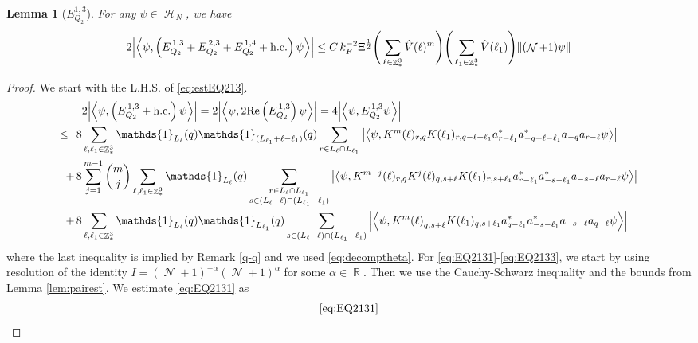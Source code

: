 \documentclass[sn-mathphys, Numbered ,a4paper]{sn-jnl}%
\DeclareMathOperator{\R}{\mathbb{R}}
\DeclareMathOperator{\Z}{\mathbb{Z}}
\DeclareMathOperator{\HH}{\mathcal{H}}
\DeclareMathOperator{\NN}{\mathcal{N}}
\newcommand{\half}{\frac{1}{2}}
\newcommand{\eva}[1]{\left\langle #1 \right\rangle}
\theoremstyle{plain}
\newtheorem{lemma}[theorem]{Lemma}
\theoremstyle{definition}
\theoremstyle{remark}
\theoremstyle{plain}
\theoremstyle{definition}
\theoremstyle{remark}
\begin{document}
\begin{lemma}[$E_{Q_2}^{1,3}$]\label{lem:EQ213}
For any $\psi \in \HH_N$, we have
\begin{equation}
	2\abs{\eva{\psi,\left(E^{\,1,3}_{Q_2}+E^{\,2,3}_{Q_2}+E^{\,1,4}_{Q_2}+\mathrm{h.c.}\right) \psi }} 
	\leq  C\, k_{F}^{-2} \Xi^{\half} \Bigg(\sum\limits_{\ell \in \Z^3_*} \hat{V}(\ell)^m \Bigg) \Bigg( \sum\limits_{\ell_1 \in \Z^3_*}\hat{V}(\ell_1) \Bigg)  \norm { (\NN+1) \psi }    \label{eq:estEQ213}
\end{equation}
\end{lemma}
\begin{proof}
We start with the L.H.S. of \eqref{eq:estEQ213}.
\begin{align}
	&2\abs{\eva{\psi,\left(E^{\,1,3}_{Q_2}+\mathrm{h.c.}\right) \psi }} = 2\abs{\eva{\psi,2\mathrm{Re}\left(E^{\,1,3}_{Q_2}\right) \psi }} = 4\abs{\eva{\psi, E^{\,1,3}_{Q_2} \psi }}\nonumber\\
    \leq\,\;8& \sum\limits_{\ell, \ell_1\in \Z^3_*} \mathds{1}_{L_{\ell}}(q) \mathds{1}_{(L_{\ell_1}+\ell-\ell_1)}(q) \sum\limits_{r\in L_{\ell} \cap L_{\ell_1}} \abs{\eva{\psi, K^m(\ell)_{r,q}K(\ell_1)_{r,q-\ell+\ell_1}a^*_{r-\ell_1}a^*_{-q+\ell-\ell_1} a_{-q}a_{r-\ell} \psi }}\label{eq:EQ2131}\\
    +\,8& \sum\limits_{j=1}^{m-1} {{m}\choose j} \sum\limits_{\ell, \ell_1\in \Z^3_*}\mathds{1}_{L_{\ell}}(q) \sum\limits_{\substack{r\in L_{\ell} \cap L_{\ell_1}\\ s \in (L_{\ell}-\ell) \cap (L_{\ell_1}-\ell_1)}}  \abs{\eva{\psi, K^{m-j}(\ell)_{r,q} K^{j}(\ell)_{q,s+\ell} K(\ell_1)_{r,s+\ell_1}a^*_{r-\ell_1}a^*_{-s-\ell_1} a_{-s-\ell}a_{r-\ell}  \psi }}\label{eq:EQ2132}\\
    +\,8&\sum\limits_{\ell, \ell_1\in \Z^3_*} \mathds{1}_{L_{\ell}}(q) \mathds{1}_{L_{\ell_1}}(q) \sum\limits_{ s \in (L_{\ell}-\ell) \cap (L_{\ell_1}-\ell_1)} \abs{\eva{\psi, K^m{(\ell)}_{q,s+\ell} K(\ell_1)_{q,s+\ell_1} a^*_{q-\ell_1} a^*_{-s-\ell_1} a_{-s-\ell} a_{q-\ell} \psi }}\label{eq:EQ2133}
\end{align}
where the last inequality is implied by Remark \ref{q-q} and we used \eqref{eq:decomptheta}.
For \eqref{eq:EQ2131}-\eqref{eq:EQ2133}, we start by using resolution of the identity $I = (\NN+1)^{-\alpha}(\NN+1)^{\alpha}$ for some $\alpha \in \R$. Then we use the Cauchy-Schwarz inequality and the bounds from Lemma \ref{lem:pairest}.
We estimate \eqref{eq:EQ2131} as
\begin{alignat}{2}
    &\eqref{eq:EQ2131}\nonumber\\

\end{alignat}
\end{proof}
\end{document}
